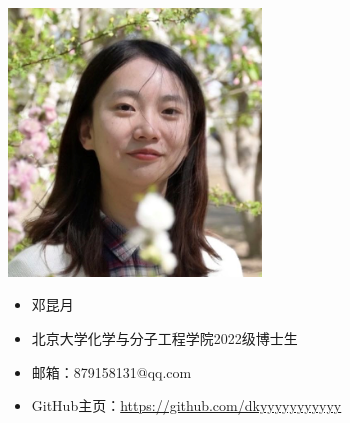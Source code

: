 \begin{figure}[ht]
    \hfill
    \begin{minipage}[c]{0.4\textwidth}
        \includegraphics[width=0.6\textwidth]{./image/author/author-dky.png}
    \end{minipage}
    \hfil
    \begin{minipage}[c]{0.5\textwidth}
        \begin{itemize}
            \item 邓昆月
            \item 北京大学化学与分子工程学院2022级博士生
            \item 邮箱：879158131@qq.com
            \item GitHub主页：\href{https://github.com/dkyyyyyyyyyyy}{https://github.com/dkyyyyyyyyyyy}
        \end{itemize}
    \end{minipage}
    \vspace{0.5cm}


\end{figure}
